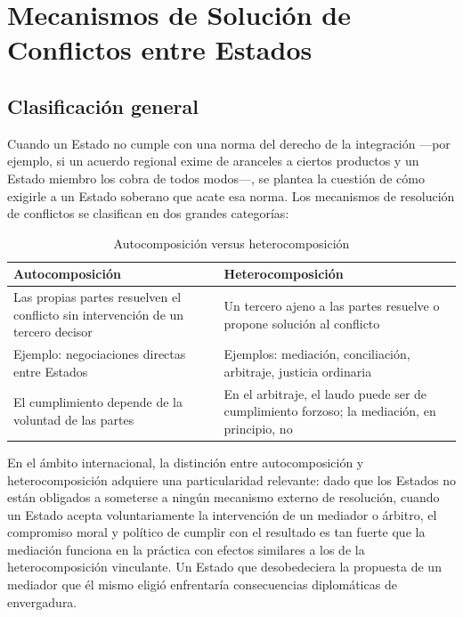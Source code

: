 \documentclass[12pt,oneside]{book}
\begin{document}
\chapter{Mecanismos de Solución de Conflictos entre Estados}

\section{Clasificación general}

Cuando un Estado no cumple con una norma del derecho de la integración —por ejemplo, si un acuerdo regional exime de aranceles a ciertos productos y un Estado miembro los cobra de todos modos—, se plantea la cuestión de cómo exigirle a un Estado soberano que acate esa norma. Los mecanismos de resolución de conflictos se clasifican en dos grandes categorías:

\begin{table}[H]
\centering
\caption{Autocomposición versus heterocomposición}
\begin{tabularx}{\textwidth}{
    >{\raggedright\arraybackslash}X
    >{\raggedright\arraybackslash}X
}
\toprule
\textbf{Autocomposición} & \textbf{Heterocomposición} \\
\midrule
Las propias partes resuelven el conflicto sin intervención de un tercero decisor & Un tercero ajeno a las partes resuelve o propone solución al conflicto \\
\addlinespace
Ejemplo: negociaciones directas entre Estados & Ejemplos: mediación, conciliación, arbitraje, justicia ordinaria \\
\addlinespace
El cumplimiento depende de la voluntad de las partes & En el arbitraje, el laudo puede ser de cumplimiento forzoso; la mediación, en principio, no \\
\bottomrule
\end{tabularx}
\end{table}

\begin{important}
En el ámbito internacional, la distinción entre autocomposición y heterocomposición adquiere una particularidad relevante: dado que los Estados no están obligados a someterse a ningún mecanismo externo de resolución, cuando un Estado acepta voluntariamente la intervención de un mediador o árbitro, el compromiso moral y político de cumplir con el resultado es tan fuerte que la mediación funciona en la práctica con efectos similares a los de la heterocomposición vinculante. Un Estado que desobedeciera la propuesta de un mediador que él mismo eligió enfrentaría consecuencias diplomáticas de envergadura.
\end{important}
\end{document}
